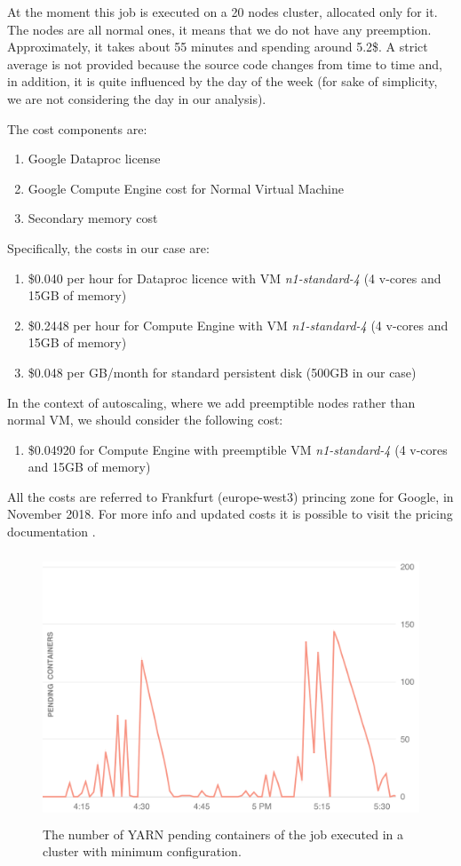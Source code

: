 \documentclass[12pt,twoside,cucitura]{toptesi}
\begin{document}
At the moment this job is executed on a 20 nodes cluster, allocated only for it. The nodes are all normal ones, it means that we do not have any preemption. Approximately, it takes about 55 minutes and spending around 5.2\$. A strict average is not provided because the source code changes from time to time and, in addition, it is quite influenced by the day of the week (for sake of simplicity, we are not considering the day in our analysis).

The cost components are:
\begin{enumerate}
	\item Google Dataproc license
	\item Google Compute Engine cost for Normal Virtual Machine
	\item Secondary memory cost
\end{enumerate}

Specifically, the costs in our case are:
\begin{enumerate}
	\item \$0.040 per hour for Dataproc licence with VM \textit{n1-standard-4} (4 v-cores and 15GB of memory)
	\item \$0.2448 per hour for Compute Engine with VM \textit{n1-standard-4} (4 v-cores and 15GB of memory)
	\item \$0.048 per GB/month for standard persistent disk (500GB in our case)
\end{enumerate}

In the context of autoscaling, where we add preemptible nodes rather than normal VM, we should consider the following cost:
\begin{enumerate}
	\item \$0.04920 for Compute Engine with preemptible VM \textit{n1-standard-4} (4 v-cores and 15GB of memory)
\end{enumerate}

All the costs are referred to Frankfurt (europe-west3) princing zone for Google, in November 2018. For more info and updated costs it is possible to visit the pricing documentation \cite{ce-pricing}\cite{dataproc-pricing}.


\begin{figure}
\centering
\includegraphics[height=80mm]{job-profile}
\caption{The number of YARN pending containers of the job executed in a cluster with minimum configuration.}\label{fig:job-profile}
\end{figure}
\end{document}
